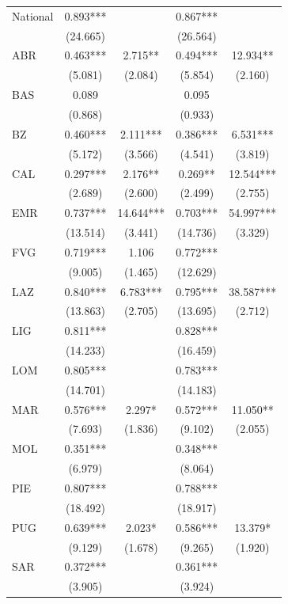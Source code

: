\documentclass[12pt]{article}
\begin{document}
\begin{longtable}{@{}lcccc@{}}
        National & 0.893*** & & 0.867*** &  \\ 
         & (24.665) & & (26.564) &  \\ 
        ABR & 0.463*** & 2.715** & 0.494*** & 12.934** \\ 
         & (5.081) & (2.084) & (5.854) & (2.160) \\ 
        BAS & 0.089 &  & 0.095 &  \\ 
         & (0.868) &  & (0.933) &  \\ 
        BZ & 0.460*** & 2.111*** & 0.386*** & 6.531*** \\ 
         & (5.172) & (3.566) & (4.541) & (3.819) \\ 
        CAL & 0.297*** & 2.176** & 0.269** & 12.544*** \\ 
         & (2.689) & (2.600) & (2.499) & (2.755) \\ 
        EMR & 0.737*** & 14.644*** & 0.703*** & 54.997*** \\ 
         & (13.514) & (3.441) & (14.736) & (3.329) \\ 
        FVG & 0.719*** & 1.106 & 0.772*** &  \\ 
         & (9.005) & (1.465) & (12.629) &  \\ 
        LAZ & 0.840*** & 6.783*** & 0.795*** & 38.587*** \\ 
         & (13.863) & (2.705) & (13.695) & (2.712) \\ 
        LIG & 0.811*** &  & 0.828*** &  \\ 
         & (14.233) &  & (16.459) &  \\ 
        LOM & 0.805*** &  & 0.783*** &  \\ 
         & (14.701) &  & (14.183) &  \\ 
        MAR & 0.576*** & 2.297* & 0.572*** & 11.050** \\ 
         & (7.693) & (1.836) & (9.102) & (2.055) \\ 
        MOL & 0.351*** & & 0.348*** &  \\ 
         & (6.979) &  & (8.064) &  \\ 
        PIE & 0.807*** &  & 0.788*** &  \\ 
         & (18.492) &  & (18.917) &  \\ 
        PUG & 0.639*** & 2.023* & 0.586*** & 13.379* \\ 
         & (9.129) & (1.678) & (9.265) & (1.920) \\ 
        SAR & 0.372*** &  & 0.361*** &  \\ 
         & (3.905) & & (3.924) &  \\ 

\end{longtable}
\end{document}
